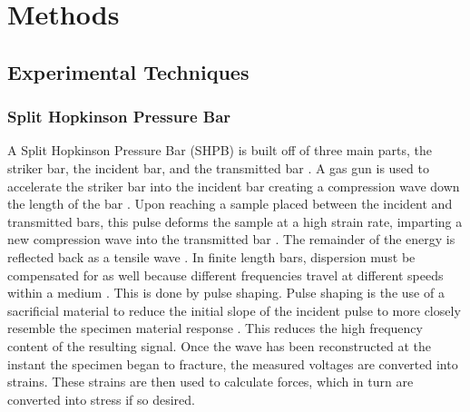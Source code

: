 \documentclass[12pt]{article}
\begin{document}
\section{Methods}

\subsection{Experimental Techniques} 

\subsubsection {Split Hopkinson Pressure Bar} %

A Split Hopkinson Pressure Bar (SHPB) is built off of three main parts, the striker bar, the incident bar, and the transmitted bar \cite{Frew} \cite{Frew2002}. A gas gun is used to accelerate the striker bar into the incident bar creating a compression wave down the length of the bar \cite{Frew}. Upon reaching a sample placed between the incident and transmitted bars, this pulse deforms the sample at a high strain rate, imparting a new compression wave into the transmitted bar \cite{Dai}. The remainder of the energy is reflected back as a tensile wave \cite{Gama}. In finite length bars, dispersion must be compensated for as well because different frequencies travel at different speeds within a medium \cite{Gama}. This is done by pulse shaping. Pulse shaping is the use of a sacrificial material to reduce the initial slope of the incident pulse to more closely resemble the specimen material response \cite{Frew2002}. This reduces the high frequency content of the resulting signal. Once the wave has been reconstructed at the instant the specimen began to fracture, the measured voltages are converted into strains. These strains are then used to calculate forces, which in turn are converted into stress if so desired. 
\end{document}
